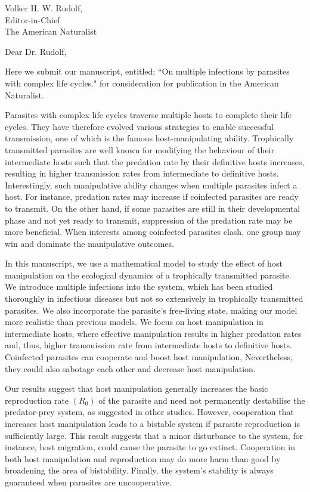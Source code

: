 \documentclass[10,DIN, pagenumber=false, parskip=half,fromalign=right, fromphone=false,fromemail=false, fromurl=false,fromlogo=true, fromrule=false]{scrlttr2}
\begin{document}
\sffamily

\begin{letter}{
\sffamily
\vspace{-0.4cm}
Volker H. W. Rudolf,\\
Editor-in-Chief\\
The American Naturalist
}
\opening{\sffamily \vspace{-1cm} Dear Dr. Rudolf,}
\vspace{-0.3cm}

Here we submit our manuscript, entitled: ``On multiple infections by parasites with complex life cycles." for consideration for publication in the American Naturalist.

Parasites with complex life cycles traverse multiple hosts to complete their life cycles.
They have therefore evolved various strategies to enable successful transmission, one of which is the famous host-manipulating ability.
Trophically transmitted parasites are well known for modifying the behaviour of their intermediate hosts such that the predation rate by their definitive hosts increases, resulting in higher transmission rates from intermediate to definitive hosts.
Interestingly, such manipulative ability changes when multiple parasites infect a host. 
For instance, predation rates may increase if coinfected parasites are ready to transmit. 
On the other hand, if some parasites are still in their developmental phase and not yet
ready to transmit, suppression of the predation rate may be more beneficial.
When interests among coinfected parasites clash, one group may win and dominate the manipulative outcomes.

In this manuscript, we use a mathematical model to study the effect of host manipulation on the ecological dynamics of a trophically transmitted parasite.
We introduce multiple infections into the system, which has been studied thoroughly in
infectious diseases but not so extensively in trophically transmitted parasites.
We also incorporate the parasite's free-living state, making our model more realistic than previous models.
We focus on host manipulation in intermediate hosts, where effective manipulation results in higher predation rates and, thus, higher transmission rate from intermediate hosts to definitive hosts.
Coinfected parasites can cooperate and boost host manipulation,
Nevertheless, they could also sabotage each other and decrease host manipulation.

Our results suggest that host manipulation generally increases the basic reproduction rate $(R_0)$ of the parasite and need not permanently destabilise the predator-prey system, as suggested in other studies.
However, cooperation that increases host manipulation leads to a bistable system if parasite reproduction is sufficiently large.
This result suggests that a minor disturbance to the system, for instance, host migration, could cause the parasite to go extinct.
Cooperation in both host manipulation and reproduction may do more harm than good by broadening the area of bistability.
Finally, the system's stability is always guaranteed when parasites are uncooperative.


\end{letter}
\end{document}
